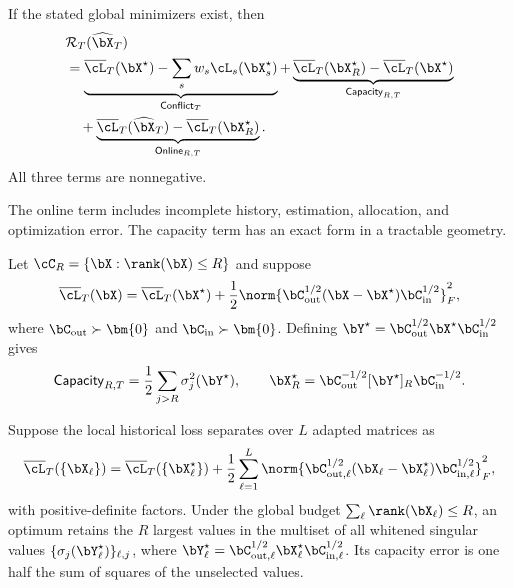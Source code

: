 \begin{proposition}
\label{prop:error-decomposition}
If the stated global minimizers exist, then
\begin{align}
&\mathcal{R}_T(\widehat{\bX}_T)
  \notag\\
&=\underbrace{\overline{\cL}_T(\bX^\star)
  -\sum_s w_s\cL_s(\bX_s^\star)}_{\mathsf{Conflict}_T}
  +\underbrace{\overline{\cL}_T(\bX_R^\star)
  -\overline{\cL}_T(\bX^\star)}_{\mathsf{Capacity}_{R,T}}
  \notag\\
&\quad+\underbrace{\overline{\cL}_T(\widehat{\bX}_T)
  -\overline{\cL}_T(\bX_R^\star)}_{\mathsf{Online}_{R,T}}.
  \label{eq:three-way-decomposition}
\end{align}
All three terms are nonnegative.
\end{proposition}

The online term includes incomplete history, estimation, allocation, and
optimization error. The capacity term has an exact form in a tractable geometry.

\begin{theorem}
\label{thm:spectral-capacity}
Let $\cC_R=\{\bX:\rank(\bX)\leq R\}$ and suppose
\begin{equation}
  \overline{\cL}_T(\bX)
  =\overline{\cL}_T(\bX^\star)
  +\frac12\norm{
  \bC_{\mathrm{out}}^{1/2}(\bX-\bX^\star)
  \bC_{\mathrm{in}}^{1/2}}_F^2,
  \label{eq:kronecker-quadratic}
\end{equation}
where $\bC_{\mathrm{out}}\succ\bm{0}$ and
$\bC_{\mathrm{in}}\succ\bm{0}$. Defining
$\bY^\star=\bC_{\mathrm{out}}^{1/2}\bX^\star
\bC_{\mathrm{in}}^{1/2}$ gives
\begin{equation}
  \mathsf{Capacity}_{R,T}
  =\frac12\sum_{j>R}\sigma_j^2(\bY^\star),
  \qquad
  \bX_R^\star=\bC_{\mathrm{out}}^{-1/2}
  [\bY^\star]_R\bC_{\mathrm{in}}^{-1/2}.
  \label{eq:spectral-capacity}
\end{equation}
\end{theorem}

\begin{corollary}
\label{cor:global-layer-allocation}
Suppose the local historical loss separates over $L$ adapted matrices as
\begin{equation}
  \overline{\cL}_T(\{\bX_\ell\})
  =\overline{\cL}_T(\{\bX_\ell^\star\})
  +\frac12\sum_{\ell=1}^{L}
  \norm{\bC_{\mathrm{out},\ell}^{1/2}
  (\bX_\ell-\bX_\ell^\star)
  \bC_{\mathrm{in},\ell}^{1/2}}_F^2,
  \label{eq:layer-separable-quadratic}
\end{equation}
with positive-definite factors. Under the global budget
$\sum_\ell\rank(\bX_\ell)\leq R$, an optimum retains the $R$ largest values
in the multiset of all whitened singular values
$\{\sigma_j(\bY_\ell^\star)\}_{\ell,j}$, where
$\bY_\ell^\star=\bC_{\mathrm{out},\ell}^{1/2}
\bX_\ell^\star\bC_{\mathrm{in},\ell}^{1/2}$. Its capacity error is one half
the sum of squares of the unselected values.
\end{corollary}

